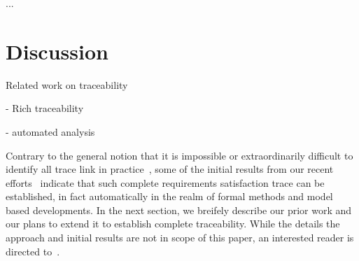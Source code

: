 ...
\section{Discussion}


Related work on traceability

- Rich traceability

- automated analysis

Contrary to the general notion that it is impossible or extraordinarily difficult to identify all trace link in practice~\cite{stravsunskas2002traceability}, some of the initial results from our recent efforts~\cite{IVCTechReport} indicate that such complete requirements satisfaction trace can be established, in fact automatically in the realm of formal methods and model based developments. In the next section, we breifely describe our prior work and our plans to extend it to establish complete traceability. While the details the approach and initial results are not in scope of this paper, an interested reader is directed to~\cite{IVCTechReport}.
